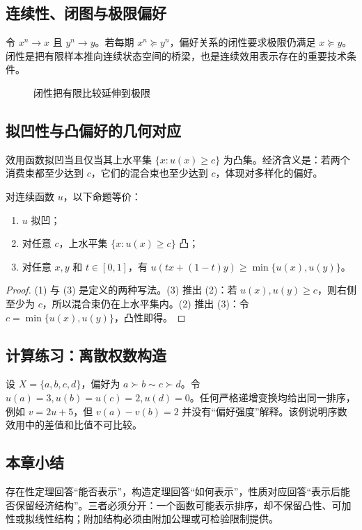 \subsection{连续性、闭图与极限偏好}
令 $x^n\to x$ 且 $y^n\to y$。若每期 $x^n\succeq y^n$，偏好关系的闭性要求极限仍满足 $x\succeq y$。闭性是把有限样本推向连续状态空间的桥梁，也是连续效用表示存在的重要技术条件。

\begin{figure}[H]\centering
{}
\caption{闭性把有限比较延伸到极限}
\end{figure}

\subsection{拟凹性与凸偏好的几何对应}
效用函数拟凹当且仅当其上水平集 $\{x:u(x)\ge c\}$ 为凸集。经济含义是：若两个消费束都至少达到 $c$，它们的混合束也至少达到 $c$，体现对多样化的偏好。

\begin{theorem}[拟凹性的等价表述]
对连续函数 $u$，以下命题等价：
\begin{enumerate}
\item $u$ 拟凹；
\item 对任意 $c$，上水平集 $\{x:u(x)\ge c\}$ 凸；
\item 对任意 $x,y$ 和 $t\in[0,1]$，有 $u(tx+(1-t)y)\ge\min\{u(x),u(y)\}$。
\end{enumerate}
\end{theorem}
\begin{proof}
(1) 与 (3) 是定义的两种写法。(3) 推出 (2)：若 $u(x),u(y)\ge c$，则右侧至少为 $c$，所以混合束仍在上水平集内。(2) 推出 (3)：令 $c=\min\{u(x),u(y)\}$，凸性即得。
\end{proof}

\subsection{计算练习：离散权数构造}
设 $X=\{a,b,c,d\}$，偏好为 $a\succ b\sim c\succ d$。令
$u(a)=3,u(b)=u(c)=2,u(d)=0$。任何严格递增变换均给出同一排序，例如 $v=2u+5$，但 $v(a)-v(b)=2$ 并没有“偏好强度”解释。该例说明序数效用中的差值和比值不可比较。

\subsection{本章小结}
存在性定理回答“能否表示”，构造定理回答“如何表示”，性质对应回答“表示后能否保留经济结构”。三者必须分开：一个函数可能表示排序，却不保留凸性、可加性或拟线性结构；附加结构必须由附加公理或可检验限制提供。
